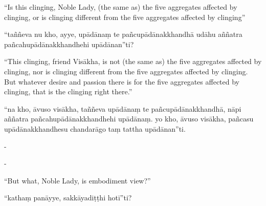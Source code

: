 \begin{samepage}
\begin{leftcolumn*}
“Is this clinging, Noble Lady, (the same as) the five aggregates affected by clinging, or is clinging different from the five aggregates affected by clinging”
\end{leftcolumn*}

\begin{rightcolumn}
“taññeva nu kho, ayye, upādānaṃ te pañcupādānakkhandhā udāhu aññatra pañcahupādānakkhandhehi upādānan”ti?
\end{rightcolumn}
\end{samepage}

\begin{samepage}
\begin{leftcolumn*}
“This clinging, friend Visākha, is not (the same as) the five aggregates affected by clinging, nor is clinging different from the five aggregates affected by clinging. But whatever desire and passion there is for the five aggregates affected by clinging, that is the clinging right there.”
\end{leftcolumn*}

\begin{rightcolumn}
“na kho, āvuso visākha, taññeva upādānaṃ te pañcupādānakkhandhā, nāpi aññatra pañcahupādānakkhandhehi upādānaṃ. yo kho, āvuso visākha, pañcasu upādānakkhandhesu chandarāgo taṃ tattha upādānan”ti.
\end{rightcolumn}
\end{samepage}

\begin{samepage}
\begin{leftcolumn*}
-
\end{leftcolumn*}

\begin{rightcolumn}
-
\end{rightcolumn}
\end{samepage}

\begin{samepage}
\begin{leftcolumn*}
“But what, Noble Lady, is embodiment view?”
\end{leftcolumn*}

\begin{rightcolumn}
“kathaṃ panāyye, sakkāyadiṭṭhi hotī”ti?
\end{rightcolumn}
\end{samepage}


